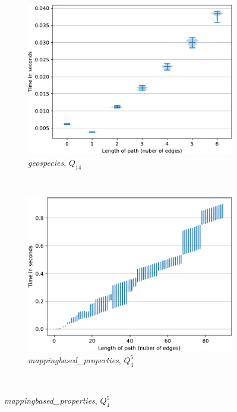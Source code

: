 \begin{figure}
     \begin{subfigure}[b]{0.24\textwidth}
         \centering
         \includegraphics[width=\textwidth]{../paper/data/geo_rpq_single_path/q_14_5.pdf}
         \caption{\footnotesize \textit{geospecies}, $Q_{14}$}
         \label{fig:geo_tensors_rpq}
     \end{subfigure}
     ~\begin{subfigure}[b]{0.24\textwidth}
         \centering
         \includegraphics[width=\textwidth]{../paper/data/CF/Tensor_path/dbpedia_path_tensor.pdf}
         \caption{\footnotesize \textit{mappingbased\_properties}, $Q_{4}^5$}
         \label{fig:dbpedia_tensors_rpq}
     \end{subfigure}\\

\end{figure}
